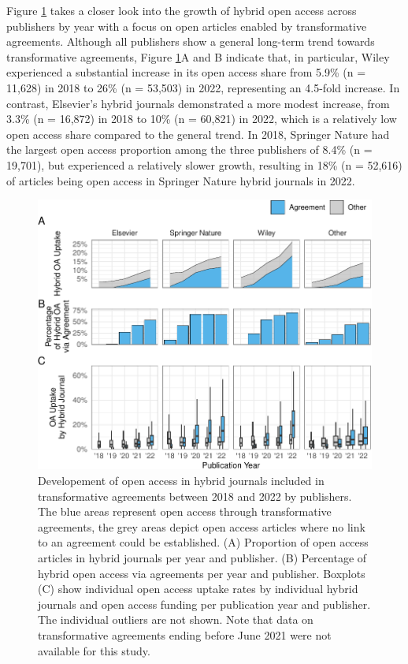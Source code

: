 \documentclass[a4paper,man,floatsintext,longtable,noextraspace,12pt]{apa6}
\begin{document}
Figure \ref{fig:publisher_figure} takes a closer look into the growth of
hybrid open access across publishers by year with a focus on open
articles enabled by transformative agreements. Although all publishers
show a general long-term trend towards transformative agreements, Figure
\ref{fig:publisher_figure}A and B indicate that, in particular, Wiley
experienced a substantial increase in its open access share from 5.9\%
(n = 11,628) in 2018 to 26\% (n = 53,503) in 2022, representing an
4.5-fold increase. In contrast, Elsevier's hybrid journals demonstrated
a more modest increase, from 3.3\% (n = 16,872) in 2018 to 10\% (n =
60,821) in 2022, which is a relatively low open access share compared to
the general trend. In 2018, Springer Nature had the largest open access
proportion among the three publishers of 8.4\% (n = 19,701), but
experienced a relatively slower growth, resulting in 18\% (n = 52,616)
of articles being open access in Springer Nature hybrid journals in
2022.

\begin{figure}[ht!]

{\centering \includegraphics[width=0.99\linewidth,]{fig/publisher_figure-1} 

}

\caption{Developement of open access in hybrid journals included in transformative agreements between 2018 and 2022 by publishers. The blue areas represent open access through transformative agreements, the grey areas depict open access articles where no link to an agreement could be established. (A) Proportion of open access articles in hybrid journals per year and publisher. (B) Percentage of hybrid open access via agreements per year and publisher. Boxplots (C) show individual open access uptake rates by individual hybrid journals and open access funding per publication year and publisher. The individual outliers are not shown. Note that data on transformative agreements ending before June 2021 were not available for this study.}\label{fig:publisher_figure}
\end{figure}
\end{document}
